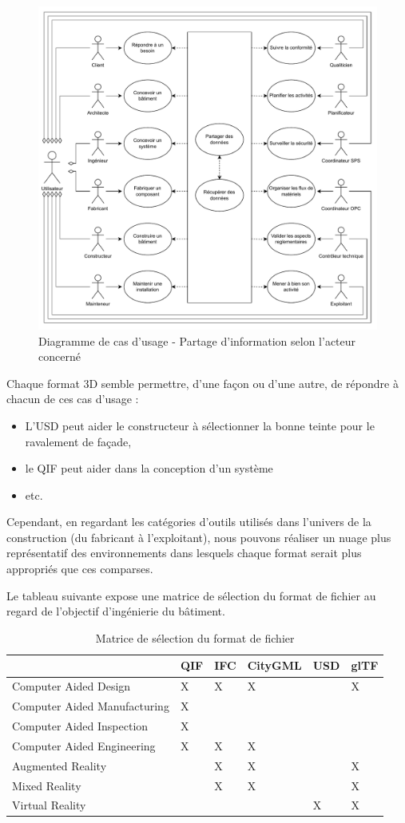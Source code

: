 \documentclass[a4paper,12pt]{article}
\begin{document}
\begin{figure}
\centering
\includegraphics[width=.9\linewidth]{./imports/3DFiles_UseCase.pdf}
\caption{\label{fig:orga9d6dea}Diagramme de cas d'usage - Partage d'information selon l'acteur concerné}
\end{figure}

Chaque format 3D semble permettre, d'une façon ou d'une autre, de répondre à chacun de ces cas d'usage :
\begin{itemize}
\item L'USD peut aider le constructeur à sélectionner la bonne teinte pour le ravalement de façade,
\item le QIF peut aider dans la conception d'un système
\item etc.
\end{itemize}

Cependant, en regardant les catégories d'outils utilisés dans l'univers de la construction (du fabricant à l'exploitant), nous pouvons réaliser un nuage plus représentatif des environnements dans lesquels chaque format serait plus appropriés que ces comparses.

Le tableau suivante expose une matrice de sélection du format de fichier au regard de l'objectif d'ingénierie du bâtiment.

\begin{table}[htbp]
\caption{Matrice de sélection du format de fichier}
\centering
\begin{tabular}{llllll}
 & QIF & IFC & CityGML & USD & glTF\\
\hline
Computer Aided Design & X & X & X &  & X\\
Computer Aided Manufacturing & X &  &  &  & \\
Computer Aided Inspection & X &  &  &  & \\
Computer Aided Engineering & X & X & X &  & \\
Augmented Reality &  & X & X &  & X\\
Mixed Reality &  & X & X &  & X\\
Virtual Reality &  &  &  & X & X\\
\end{tabular}
\end{table}
\end{document}
